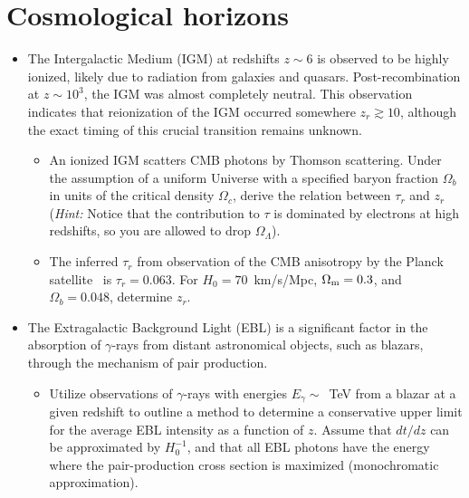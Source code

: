 \section{Cosmological horizons}

\begin{itemize}

\item The Intergalactic Medium (IGM) at redshifts $z \sim 6$ is observed to be highly ionized, likely due to radiation from galaxies and quasars. Post-recombination at $z \sim 10^3$, the IGM was almost completely neutral. This observation indicates that reionization of the IGM occurred somewhere $z_r \gtrsim 10$, although the exact timing of this crucial transition remains unknown. 

\begin{itemize}
\item An ionized IGM scatters CMB photons by Thomson scattering. Under the assumption of a uniform Universe with a specified baryon fraction $\Omega_b$ in units of the critical density $\Omega_c$, derive the relation between $\tau_r$ and $z_r$ (\emph{Hint:} Notice that the contribution to $\tau$ is dominated by electrons at high redshifts, so you are allowed to drop $\Omega_\Lambda$).


\item The inferred $\tau_r$ from observation of the CMB anisotropy by the Planck satellite~\cite{} is $\tau_r = 0.063$. For $H_0 = 70$~km/s/Mpc, $\Omega_{\rm m} = 0.3$, and $\Omega_b = 0.048$, determine $z_r$.

\end{itemize}

\item The Extragalactic Background Light (EBL) is a significant factor in the absorption of $\gamma$-rays from distant astronomical objects, such as blazars, through the mechanism of pair production. 

\begin{itemize}
\item Utilize observations of $\gamma$-rays with energies $E_\gamma \sim$~TeV from a blazar at a given redshift to outline a method to determine a conservative upper limit for the average EBL intensity as a function of $z$. Assume that $dt/dz$ can be approximated by $H_0^{-1}$, and that all EBL photons have the energy where the pair-production cross section is maximized (monochromatic approximation).
\end{itemize}

\end{itemize}
